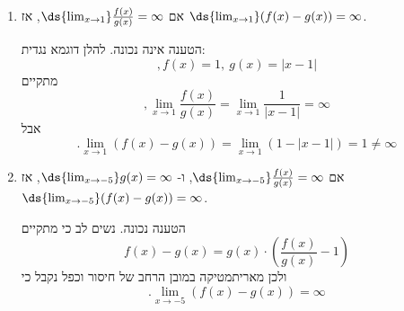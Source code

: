 \begin{enumerate}
    \item אם
    $\ds{\lim_{x\to1}}\frac{f(x)}{g(x)}=\infty$,
    אז
    $\ds{\lim_{x\to1}}(f(x)-g(x))=\infty$.

\ifsol
{}
\begin{solbox}
    הטענה אינה נכונה. להלן דוגמא נגדית:
    $$,f(x)=1,\ g(x)=|x-1|$$
    מתקיים
    $$,\lim_{x\to1}\frac{f(x)}{g(x)}=\lim_{x\to1}\frac{1}{|x-1|}=\infty$$
    אבל
    $$.\lim_{x\to1}(f(x)-g(x))=\lim_{x\to1}(1-|x-1|)=1\neq\infty$$
\end{solbox}
\fi

    \item אם
    $\ds{\lim_{x\to-5}}\frac{f(x)}{g(x)}=\infty$,
    ו-
    $\ds{\lim_{x\to-5}}g(x)=\infty$,
    אז
    $\ds{\lim_{x\to-5}}(f(x)-g(x))=\infty$.

\ifsol
{}
\begin{solbox}
    הטענה נכונה.
    נשים לב כי מתקיים
    $$f(x)-g(x)=g(x)\cdot\left(
    \frac{f(x)}{g(x)}-1
    \right)$$
    ולכן מאריתמטיקה במובן הרחב של חיסור וכפל נקבל כי
    $$.\lim_{x\to-5}
    (f(x)-g(x))=\infty$$
\end{solbox}
\fi
\end{enumerate}
